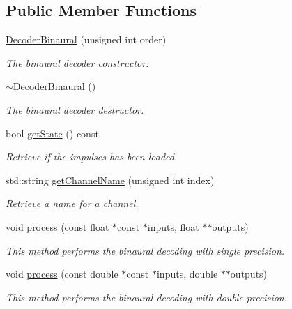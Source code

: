 \subsection*{Public Member Functions}
\begin{DoxyCompactItemize}
\item 
\hyperlink{class_hoa2_d_1_1_decoder_binaural_a614b402069c035eb1bb03d3ec79c4098}{Decoder\-Binaural} (unsigned int order)
\begin{DoxyCompactList}\small\item\em The binaural decoder constructor. \end{DoxyCompactList}\item 
\hyperlink{class_hoa2_d_1_1_decoder_binaural_a3aa8b84a571c2c031dcae2b94b8737e4}{$\sim$\-Decoder\-Binaural} ()
\begin{DoxyCompactList}\small\item\em The binaural decoder destructor. \end{DoxyCompactList}\item 
bool \hyperlink{class_hoa2_d_1_1_decoder_binaural_a8cb958da4f7f5f5888cd894a52f69aa5}{get\-State} () const 
\begin{DoxyCompactList}\small\item\em Retrieve if the impulses has been loaded. \end{DoxyCompactList}\item 
std\-::string \hyperlink{class_hoa2_d_1_1_decoder_binaural_a045e4d443418211eca3074e10719ecd5}{get\-Channel\-Name} (unsigned int index)
\begin{DoxyCompactList}\small\item\em Retrieve a name for a channel. \end{DoxyCompactList}\item 
void \hyperlink{class_hoa2_d_1_1_decoder_binaural_accbfe84ed3e43f1e9ca93e58edb7020f}{process} (const float $\ast$const $\ast$inputs, float $\ast$$\ast$outputs)
\begin{DoxyCompactList}\small\item\em This method performs the binaural decoding with single precision. \end{DoxyCompactList}\item 
void \hyperlink{class_hoa2_d_1_1_decoder_binaural_afab13c873d9c9b1a883bcc993ec0ec35}{process} (const double $\ast$const $\ast$inputs, double $\ast$$\ast$outputs)
\begin{DoxyCompactList}\small\item\em This method performs the binaural decoding with double precision. \end{DoxyCompactList}\end{DoxyCompactItemize}
